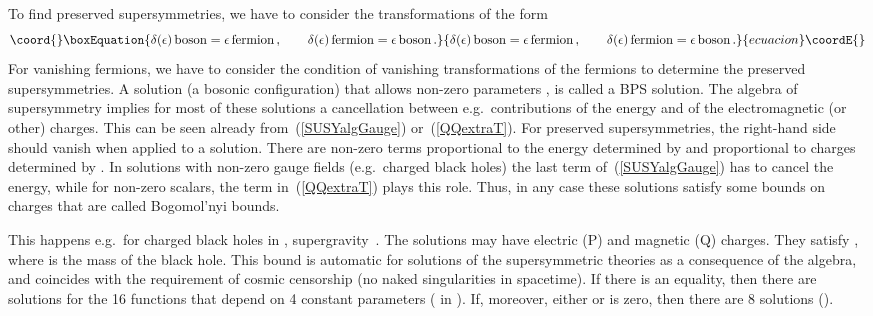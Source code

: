 \documentclass[a4paper,11pt,twoside]{article}
\providecommand{\OliveGreen}[1]{#1}
\begin{document}
To find preserved supersymmetries, we have to consider the
transformations of the form
\begin{equation}\coord{}\boxEquation{
  \delta (\OliveGreen{\epsilon })\,{\rm boson}=\OliveGreen{\epsilon
  }\,\textrm{fermion}\,,\qquad
\delta (\OliveGreen{\epsilon })\,{\rm fermion}=\OliveGreen{\epsilon
  }\,\textrm{boson}\,.
 \label{delbosonfermion}
}{
  \delta (\OliveGreen{\epsilon })\,{\rm boson}=\OliveGreen{\epsilon
  }\,\textrm{fermion}\,,\qquad
\delta (\OliveGreen{\epsilon })\,{\rm fermion}=\OliveGreen{\epsilon
  }\,\textrm{boson}\,.
 }{ecuacion}\coordE{}\end{equation}
For vanishing fermions, we have to consider the condition of vanishing
transformations of the fermions to determine the preserved
supersymmetries. A solution (a bosonic configuration) that allows
non-zero parameters \myHighlight{$\OliveGreen{\epsilon }$}\coordHE{}, is called a BPS solution.
The algebra of supersymmetry implies for most of these solutions a
cancellation between e.g.\ contributions of the energy and of the
electromagnetic (or other) charges. This can be seen already
from~(\ref{SUSYalgGauge}) or~(\ref{QQextraT}). For preserved
supersymmetries, the right-hand side should vanish when applied to a
solution. There are non-zero terms proportional to the energy determined
by \myHighlight{$\partial _0\phi $}\coordHE{} and proportional to charges determined by \coordHE{}. In solutions with non-zero gauge fields (e.g.\ charged black holes)
the last term of~(\ref{SUSYalgGauge}) has to cancel the energy, while for
non-zero scalars, the term in~(\ref{QQextraT}) plays this role. Thus, in
any case these solutions satisfy some bounds on charges that are called
Bogomol'nyi bounds.

This happens e.g.\ for charged black holes in \coordHE{}, \coordHE{}
supergravity~\cite{Kallosh:1992ii}. The solutions may have electric (P)
and magnetic (Q) charges. They satisfy \coordHE{}, where \coordHE{} is
the mass of the black hole. This bound is automatic for solutions of the
supersymmetric theories as a consequence of the algebra, and coincides
with the requirement of cosmic censorship (no naked singularities in
spacetime). If there is an equality, then there are solutions for the 16
functions \myHighlight{$\OliveGreen{\epsilon^i_\alpha} (x)$}\coordHE{} that depend on 4 constant
parameters (\coordHE{} in \coordHE{}). If, moreover, either \coordHE{} or \coordHE{} is zero,
then there are 8 solutions (\coordHE{}).
\end{document}
